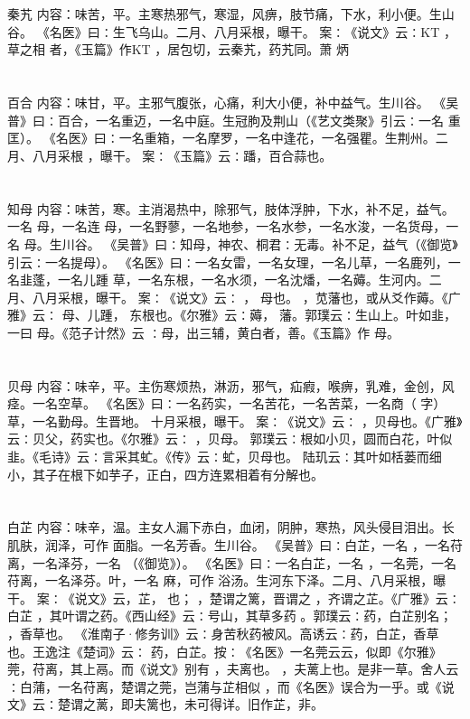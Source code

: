 \documentclass[12pt,UTF8]{ctexbook}
\begin{document}
\section{}秦艽
内容：味苦，平。主寒热邪气，寒湿，风痹，肢节痛，下水，利小便。生山谷。 
《名医》曰∶生飞乌山。二月、八月采根，曝干。 
案∶《说文》云∶KT ，草之相 者，《玉篇》作KT ，居包切，云秦艽，药艽同。萧 
炳 


\section{}百合
内容：味甘，平。主邪气腹张，心痛，利大小便，补中益气。生川谷。 
《吴普》曰∶百合，一名重迈，一名中庭。生冠朐及荆山（《艺文类聚》引云∶一名 
重匡）。 
《名医》曰∶一名重箱，一名摩罗，一名中逢花，一名强瞿。生荆州。二月、八月采根 
，曝干。 
案∶《玉篇》云∶蹯，百合蒜也。 


\section{}知母
内容：味苦，寒。主消渴热中，除邪气，肢体浮肿，下水，补不足，益气。一名 母，一名连 
母，一名野蓼，一名地参，一名水参，一名水浚，一名货母，一名 母。生川谷。 
《吴普》曰∶知母，神农、桐君∶无毒。补不足，益气（《御览》引云∶一名提母）。 
《名医》曰∶一名女雷，一名女理，一名儿草，一名鹿列，一名韭蓬，一名儿踵 
草，一名东根，一名水须，一名沈燔，一名薅。生河内。二月、八月采根，曝干。 
案∶《说文》云∶ ， 母也。 ，苋藩也，或从爻作薅。《广雅》云∶ 母、儿踵， 
东根也。《尔雅》云∶薅， 藩。郭璞云∶生山上。叶如韭，一曰 母。《范子计然》云 
∶母，出三辅，黄白者，善。《玉篇》作 母。 


\section{}贝母
内容：味辛，平。主伤寒烦热，淋沥，邪气，疝瘕，喉痹，乳难，金创，风痉。一名空草。 
《名医》曰∶一名药实，一名苦花，一名苦菜，一名商（ 字）草，一名勤母。生晋地。 
十月采根，曝干。 
案∶《说文》云∶ ，贝母也。《广雅》云∶贝父，药实也。《尔雅》云∶ ，贝母。 
郭璞云∶根如小贝，圆而白花，叶似韭。《毛诗》云∶言采其虻。《传》云∶虻，贝母也。 
陆玑云∶其叶如栝蒌而细小，其子在根下如芋子，正白，四方连累相着有分解也。 


\section{}白芷
内容：味辛，温。主女人漏下赤白，血闭，阴肿，寒热，风头侵目泪出。长肌肤，润泽，可作 
面脂。一名芳香。生川谷。 
《吴普》曰∶白芷，一名 ，一名苻离，一名泽芬，一名 （《御览》）。 
《名医》曰∶一名白芷，一名 ，一名莞，一名苻离，一名泽芬。叶，一名 麻，可作 
浴汤。生河东下泽。二月、八月采根，曝干。 
案∶《说文》云，芷， 也； ，楚谓之篱，晋谓之 ，齐谓之芷。《广雅》云∶白芷 
，其叶谓之药。《西山经》云∶号山，其草多药 。郭璞云∶药，白芷别名； ，香草也。 
《淮南子·修务训》云∶身苦秋药被风。高诱云∶药，白芷，香草也。王逸注《楚词》云∶ 
药，白芷。按∶《名医》一名莞云云，似即《尔雅》莞，苻离，其上鬲。而《说文》别有 
，夫离也。 ，夫蓠上也。是非一草。舍人云∶白蒲，一名苻离，楚谓之莞，岂蒲与芷相似 
，而《名医》误合为一乎。或《说文》云∶楚谓之蓠，即夫篱也，未可得详。旧作芷，非。 
\end{document}
